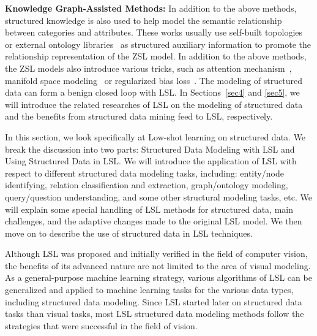 \textbf{Knowledge Graph-Assisted Methods:} In addition to the above methods, structured knowledge is also used to help model the semantic relationship between categories and attributes. These works usually use self-built topologies~ or external ontology libraries~ as structured auxiliary information to promote the relationship representation of the ZSL model.
In addition to the above methods, the ZSL models also introduce various tricks, such as attention mechanism~, manifold space modeling~ or  regularized bias loss~. The modeling of structured data can form a benign closed loop with LSL.  In Sections~\ref{sec4} and \ref{sec5}, we will introduce the related researches of LSL on the modeling of structured data and the benefits from structured data mining feed to LSL, respectively.

\label{sec4}
In this section, we look specifically at Low-shot learning on structured data. We break the discussion into two parts: Structured Data Modeling with LSL and Using Structured Data in LSL. We will introduce the application of LSL with respect to different structured data modeling tasks, including: entity/node identifying, relation classification and extraction, graph/ontology modeling, query/question understanding, and some other structural modeling tasks, etc. We will explain some special handling of LSL methods for structured data, main challenges, and the adaptive changes made to the original LSL model. We then move on to describe the use of structured data in LSL techniques.

\label{sec4.1}
Although LSL was proposed and initially verified in the field of computer vision, the benefits of its advanced nature are not limited to the area of visual modeling. As a general-purpose machine learning strategy, various algorithms of LSL can be generalized and applied to machine learning tasks for the various data types, including  structured data modeling. Since LSL started  later on structured data tasks than visual tasks, most LSL structured data modeling methods follow the  strategies that were successful in the field of vision.

